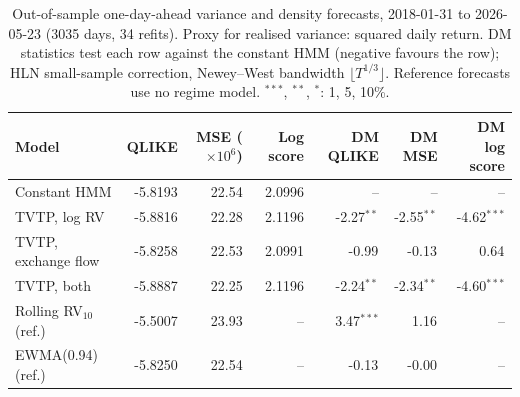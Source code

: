 \begin{table}[t]\centering\small
\caption{Out-of-sample one-day-ahead variance and density forecasts, 2018-01-31 to 2026-05-23 (3035 days, 34 refits). Proxy for realised variance: squared daily return. DM statistics test each row against the constant HMM (negative favours the row); HLN small-sample correction, Newey--West bandwidth $\lfloor T^{1/3}\rfloor$. Reference forecasts use no regime model. $^{***}$, $^{**}$, $^{*}$: 1, 5, 10\%.}\label{tab:fc}
\begin{tabular}{lrrrrrr}\toprule Model & QLIKE & MSE ($\times10^{6}$) & Log score & DM QLIKE & DM MSE & DM log score \\ \midrule
Constant HMM & -5.8193 & 22.54 & 2.0996 & -- & -- & -- \\
TVTP, log RV & -5.8816 & 22.28 & 2.1196 & -2.27$^{**}$ & -2.55$^{**}$ & -4.62$^{***}$ \\
TVTP, exchange flow & -5.8258 & 22.53 & 2.0991 & -0.99$^{}$ & -0.13$^{}$ & 0.64$^{}$ \\
TVTP, both & -5.8887 & 22.25 & 2.1196 & -2.24$^{**}$ & -2.34$^{**}$ & -4.60$^{***}$ \\
Rolling RV$_{10}$ (ref.) & -5.5007 & 23.93 & -- & 3.47$^{***}$ & 1.16$^{}$ & -- \\
EWMA(0.94) (ref.) & -5.8250 & 22.54 & -- & -0.13$^{}$ & -0.00$^{}$ & -- \\
\bottomrule\end{tabular}\end{table}
